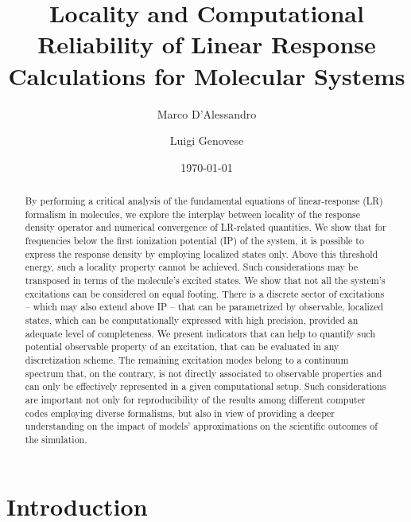 \documentclass[reprint,aps,prb]{revtex4-1}
\begin{document}

\title{Locality and Computational Reliability of Linear Response Calculations for Molecular Systems}
\author{Marco D'Alessandro}
\author{Luigi Genovese}
\date{\today}

\begin{abstract}
By performing a critical analysis of the fundamental equations of linear-response (LR) formalism in molecules,
we explore the interplay between locality of the response density operator and  numerical convergence of LR-related quantities.
We show that for frequencies below the first ionization potential (IP) of the system, it is possible to express the response density by employing localized states only.
Above this threshold energy, such a locality property cannot be achieved.
Such considerations may be transposed in terms of the molecule's excited states. We show that not all the system's excitations can be considered on equal footing.
There is a discrete sector of excitations -- which may also extend above IP -- that can be parametrized by observable, localized states, which can be computationally expressed with high precision, provided an adequate level of completeness.
We present indicators that can help to quantify such potential observable property of an excitation, that can be evaluated
in any discretization scheme.
The remaining excitation modes belong to a continuum spectrum that, on the contrary, is not directly associated to observable properties and can only be effectively represented in a given computational setup.
Such considerations are important not only for reproducibility of the results among different computer codes
employing diverse formalisms, but also in view of providing a deeper understanding on the impact of models'
approximations on the scientific outcomes of the simulation.
\end{abstract}

\maketitle

\section{Introduction}
\end{document}
